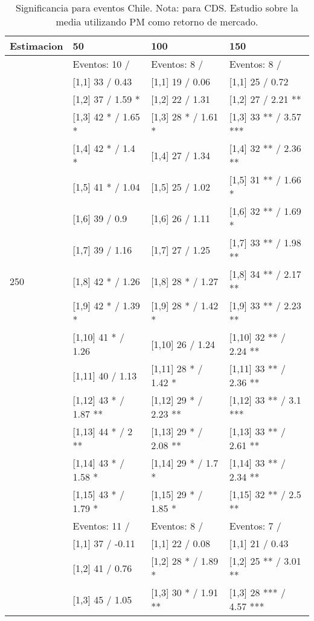 \begin{table}

\caption{Significancia para eventos Chile. Nota: para CDS. Estudio sobre la media utilizando PM como retorno de mercado.}
\centering
\begin{tabular}[t]{llll}
\toprule
Estimacion & 50 & 100 & 150\\
\midrule
 & Eventos:  10 / & Eventos:  8 / & Eventos:  8 /\\
 & {}[1,1] 33  / 0.43 & {}[1,1] 19  / 0.06 & {}[1,1] 25  / 0.72\\
 & {}[1,2] 37  / 1.59 * & {}[1,2] 22  / 1.31 & {}[1,2] 27  / 2.21 **\\
 & {}[1,3] 42 * / 1.65 * & {}[1,3] 28 * / 1.61 * & {}[1,3] 33 ** / 3.57 ***\\
 & {}[1,4] 42 * / 1.4 * & {}[1,4] 27  / 1.34 & {}[1,4] 32 ** / 2.36 **\\
\addlinespace
 & {}[1,5] 41 * / 1.04 & {}[1,5] 25  / 1.02 & {}[1,5] 31 ** / 1.66 *\\
 & {}[1,6] 39  / 0.9 & {}[1,6] 26  / 1.11 & {}[1,6] 32 ** / 1.69 *\\
 & {}[1,7] 39  / 1.16 & {}[1,7] 27  / 1.25 & {}[1,7] 33 ** / 1.98 **\\
250 & {}[1,8] 42 * / 1.26 & {}[1,8] 28 * / 1.27 & {}[1,8] 34 ** / 2.17 **\\
 & {}[1,9] 42 * / 1.39 * & {}[1,9] 28 * / 1.42 * & {}[1,9] 33 ** / 2.23 **\\
\addlinespace
 & {}[1,10] 41 * / 1.26 & {}[1,10] 26  / 1.24 & {}[1,10] 32 ** / 2.24 **\\
 & {}[1,11] 40  / 1.13 & {}[1,11] 28 * / 1.42 * & {}[1,11] 33 ** / 2.36 **\\
 & {}[1,12] 43 * / 1.87 ** & {}[1,12] 29 * / 2.23 ** & {}[1,12] 33 ** / 3.1 ***\\
 & {}[1,13] 44 * / 2 ** & {}[1,13] 29 * / 2.08 ** & {}[1,13] 33 ** / 2.61 **\\
 & {}[1,14] 43 * / 1.58 * & {}[1,14] 29 * / 1.7 * & {}[1,14] 33 ** / 2.34 **\\
\addlinespace
 & {}[1,15] 43 * / 1.79 * & {}[1,15] 29 * / 1.85 * & {}[1,15] 32 ** / 2.5 **\\
 & Eventos:  11 / & Eventos:  8 / & Eventos:  7 /\\
 & {}[1,1] 37  / -0.11 & {}[1,1] 22  / 0.08 & {}[1,1] 21  / 0.43\\
 & {}[1,2] 41  / 0.76 & {}[1,2] 28 * / 1.89 * & {}[1,2] 25 ** / 3.01 **\\
 & {}[1,3] 45  / 1.05 & {}[1,3] 30 * / 1.91 ** & {}[1,3] 28 *** / 4.57 ***\\

\end{tabular}
\end{table}
